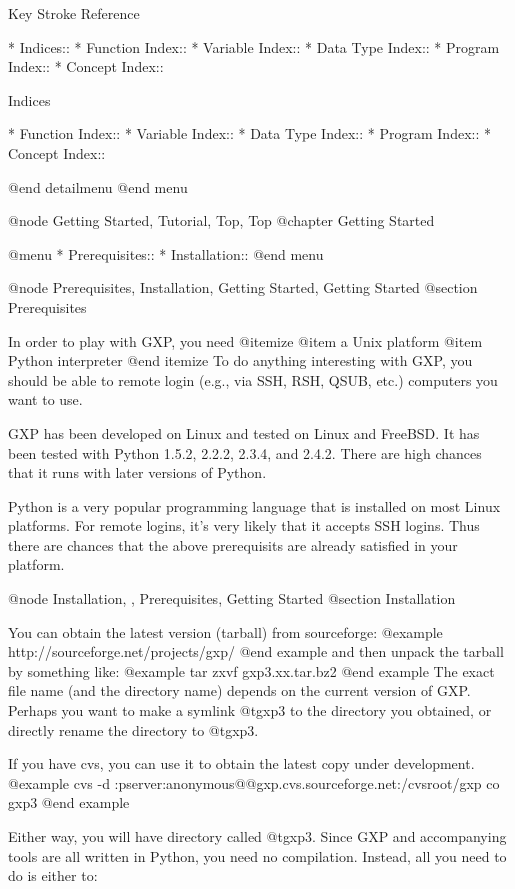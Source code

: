 Key Stroke Reference

* Indices::                     
* Function Index::              
* Variable Index::              
* Data Type Index::             
* Program Index::               
* Concept Index::               

Indices

* Function Index::              
* Variable Index::              
* Data Type Index::             
* Program Index::               
* Concept Index::               

@end detailmenu
@end menu

@node Getting Started, Tutorial, Top, Top
@chapter Getting Started


@menu
* Prerequisites::               
* Installation::                
@end menu

@node Prerequisites, Installation, Getting Started, Getting Started
@section Prerequisites

In order to play with GXP, you need
@itemize
@item a Unix platform
@item Python interpreter
@end itemize
To do anything interesting with GXP, you should be able to remote
login (e.g., via SSH, RSH, QSUB, etc.) computers you want to use.

GXP has been developed on Linux and tested on Linux and FreeBSD.  It
has been tested with Python 1.5.2, 2.2.2, 2.3.4, and 2.4.2.  There are
high chances that it runs with later versions of Python.

Python is a very popular programming language that is installed on
most Linux platforms. For remote logins, it's very likely that it
accepts SSH logins. Thus there are chances that the above prerequisits
are already satisfied in your platform.

@node Installation,  , Prerequisites, Getting Started
@section Installation

You can obtain the latest version (tarball) from sourceforge:
@example
    http://sourceforge.net/projects/gxp/
@end example
and then unpack the tarball by something like:
@example
    tar zxvf gxp3.xx.tar.bz2
@end example
The exact file name (and the directory name) depends on the current
version of GXP. Perhaps you want to make a symlink @t{gxp3} to the
directory you obtained, or directly rename the directory to @t{gxp3}.

If you have cvs, you can use it to obtain the latest copy under development.
@example
cvs -d :pserver:anonymous@@gxp.cvs.sourceforge.net:/cvsroot/gxp co gxp3
@end example

Either way, you will have directory called @t{gxp3}. Since GXP and
accompanying tools are all written in Python, you need no compilation.
Instead, all you need to do is either to:

